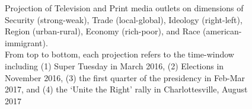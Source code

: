 \begin{figure}[t]%

    \centering

    

    \caption{Projection of Television and Print media outlets on dimensions of Security (strong-weak), Trade (local-global), Ideology (right-left), Region (urban-rural), Economy (rich-poor), and Race (american-immigrant). \\ From top to bottom, each projection refers to the time-window including (1) Super Tuesday in March 2016, (2) Elections in November 2016, (3) the first quarter of the presidency in Feb-Mar 2017, and (4) the `Unite the Right' rally in Charlottesville, August 2017}%

    \label{fig:proj_media}%

\end{figure}










